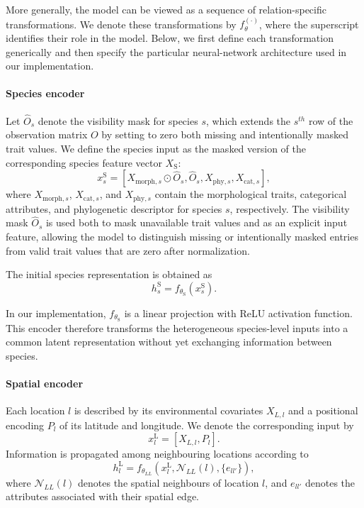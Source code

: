 \documentclass[preprint,12pt,authoryear]{elsarticle}
\begin{document}
More generally, the model can be viewed as a sequence of relation-specific transformations. We denote these transformations by \(f_{\theta}^{(\cdot)}\), where the superscript identifies their role in the model. Below, we first define each transformation generically and then specify the particular neural-network architecture used in our implementation.

\paragraph{Species encoder}

Let \(\hat O_s\) denote the visibility mask for species \(s\), which extends the $s^{th}$ row of the observation matrix $O$ by setting to zero both missing and intentionally masked trait values. We define the species input as the masked version of the corresponding species feature vector $X_\mathrm{S}$:
\begin{equation}
    x_s^{\mathrm{S}}
    =
    [
        X_{\mathrm{morph},s} \odot \hat O_s,
        \hat O_s,
        X_{\mathrm{phy},s},
        X_{\mathrm{cat},s}
        ],
\end{equation}
where \(X_{\mathrm{morph},s}\), \(X_{\mathrm{cat},s}\), and \(X_{\mathrm{phy},s}\) contain the morphological traits, categorical attributes, and phylogenetic descriptor for species $s$, respectively.
The visibility mask $\hat O_s$ is used both to mask unavailable trait values and as an explicit input feature, allowing the model to distinguish missing or intentionally masked entries from valid trait values that are zero after normalization.

The initial species representation is obtained as
\begin{equation}
    h_s^{\mathrm{S}}
    =
    f_{\theta_{\mathrm{S}}}
    \left(x_s^{\mathrm{S}}\right).
\end{equation}

In our implementation, \(f_{\theta_{\mathrm{S}}}\) is a linear projection with ReLU activation function.
This encoder therefore transforms the heterogeneous species-level inputs into a common latent representation without yet exchanging information between species.

\paragraph{Spatial encoder}

Each location \(l\) is described by its environmental covariates \(X_{L,l}\) and a positional encoding \(P_l\) of its latitude and longitude. We denote the corresponding input by
\begin{equation}
    x_l^{\mathrm{L}}=[X_{L,l},P_l].
\end{equation}
Information is propagated among neighbouring locations according to
\begin{equation}
    h_l^{\mathrm{L}}
    =
    f_{\theta_{LL}}
    \left(
        x_l^{\mathrm{L}},
        \mathcal{N}_{LL}(l),
        \{e_{ll'}\}
    \right),
\end{equation}
where \(\mathcal{N}_{LL}(l)\) denotes the spatial neighbours of location \(l\), and \(e_{ll'}\) denotes the attributes associated with their spatial edge.
\end{document}

